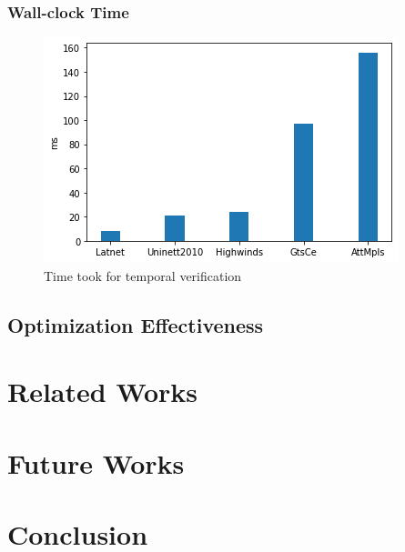 \documentclass[10pt,sigconf,letterpaper,anonymous,nonacm]{acmart}
\begin{document}
\subsubsection{Wall-clock Time}
\begin{figure}[h]
    \centering
    \includegraphics[scale=0.5]{wallclock}
    \caption{Time took for temporal verification}
    \label{fig:wallclock}
\end{figure}

\subsection{Optimization Effectiveness}



\section{Related Works}

\section{Future Works}

\section{Conclusion}



\end{document}
